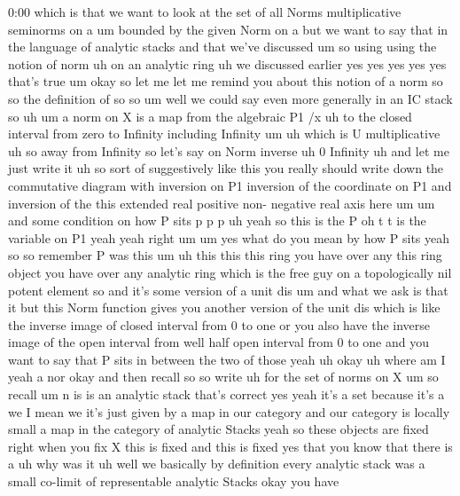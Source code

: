 \begin{unfinished}{0:00}
which  is  that  we  want  to  look  at  the  set
of  all  Norms  multiplicative  seminorms  on
a  um  bounded  by  the  given  Norm  on  a  but
we  want  to  say  that  in  the  language  of
analytic  stacks  and  that  we've  discussed
um  so  using  using  the  notion  of
norm
uh  on  an  analytic
ring  uh  we  discussed
earlier  yes  yes  yes  yes  yes  that's
true
um  okay  so  let  me  let  me  remind  you
about  this  notion  of  a  norm  so  so  the
definition  of  so  so  um  well  we  could  say
even  more  generally  in  an  IC
stack  so
uh  um  a  norm  on  X  is  a
map  from  the  algebraic  P1
/x  uh  to  the  closed  interval  from  zero
to  Infinity  including  Infinity
um  uh  which
is  U
multiplicative
uh  so  away  from
Infinity  so  let's  say  on  Norm  inverse  uh
0
Infinity  uh
and  let  me  just  write  it
uh  so  sort  of  suggestively  like  this  you
really  should  write  down  the  commutative
diagram  with  inversion  on  P1  inversion
of  the  coordinate  on  P1  and  inversion  of
the
this  extended  real  positive  non-
negative  real  axis  here
um  um  and  some
condition  on  how  P
sits  p  p  p  uh  yeah  so  this  is  the
P  oh  t  t  is  the  variable  on  P1  yeah  yeah
right
um  um  yes  what  do  you  mean  by  how  P  sits
yeah  so  so  remember  P  was  this
um  uh  this  this  this  ring  you  have  over
any  this  ring  object  you  have  over  any
analytic  ring  which  is  the  free  guy  on  a
topologically  nil  potent  element  so  and
it's  some  version  of  a  unit  dis  um  and
what  we  ask  is  that  it  but  this  Norm
function  gives  you  another  version  of
the  unit  dis  which  is  like  the  inverse
image  of  closed  interval  from  0  to  one
or  you  also  have  the  inverse  image  of
the  open  interval  from  well  half  open
interval  from  0  to  one  and  you  want  to
say  that  P  sits  in  between  the  two  of
those
yeah
uh  okay  uh  where  am  I  yeah  a  nor  okay
and  then  recall  so  so
write  uh  for  the  set  of
norms  on
X  um  so
recall  um  n  is  is  an  analytic
stack  that's  correct  yes  yeah  it's  a
set  because  it's  a  we  I  mean  we  it's
just  given  by  a  map  in  our  category  and
our  category  is  locally
small  a  map  in  the  category  of  analytic
Stacks
yeah  so  these  objects  are  fixed  right
when  you  fix  X  this  is  fixed  and  this  is
fixed  yes  that  you  know  that  there  is
a
uh  why  was  it  uh  well  we  basically  by
definition  every  analytic  stack  was  a
small  co-limit  of  representable  analytic
Stacks  okay  you  have

\end{unfinished}
